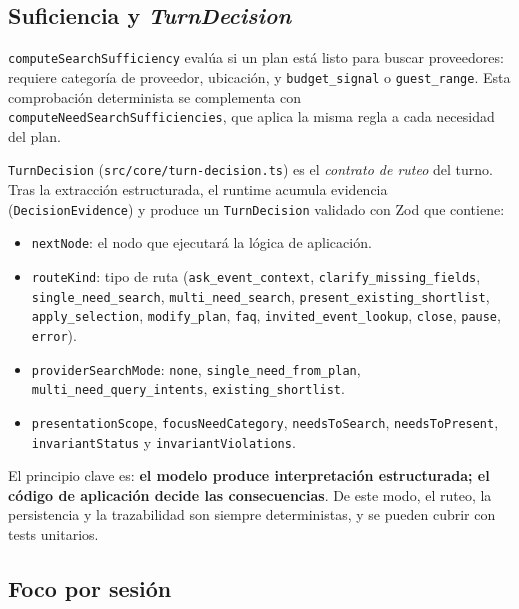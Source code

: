 \documentclass[11pt,a4paper]{article}
\begin{document}
\subsection{Suficiencia y \emph{TurnDecision}}

\texttt{computeSearchSufficiency} evalúa si un plan está listo para buscar
proveedores: requiere categoría de proveedor, ubicación, y
\texttt{budget\_signal} o \texttt{guest\_range}. Esta comprobación
determinista se complementa con \texttt{computeNeedSearchSufficiencies},
que aplica la misma regla a cada necesidad del plan.

\texttt{TurnDecision} (\texttt{src/core/turn-decision.ts}) es el
\emph{contrato de ruteo} del turno. Tras la extracción estructurada, el
runtime acumula evidencia (\texttt{DecisionEvidence}) y produce un
\texttt{TurnDecision} validado con Zod que contiene:

\begin{itemize}[leftmargin=*,itemsep=1pt]
  \item \texttt{nextNode}: el nodo que ejecutará la lógica de
        aplicación.
  \item \texttt{routeKind}: tipo de ruta
        (\texttt{ask\_event\_context}, \texttt{clarify\_missing\_fields},
        \texttt{single\_need\_search}, \texttt{multi\_need\_search},
        \texttt{present\_existing\_shortlist}, \texttt{apply\_selection},
        \texttt{modify\_plan}, \texttt{faq}, \texttt{invited\_event\_lookup},
        \texttt{close}, \texttt{pause}, \texttt{error}).
  \item \texttt{providerSearchMode}: \texttt{none},
        \texttt{single\_need\_from\_plan}, \texttt{multi\_need\_query\_intents},
        \texttt{existing\_shortlist}.
  \item \texttt{presentationScope}, \texttt{focusNeedCategory},
        \texttt{needsToSearch}, \texttt{needsToPresent},
        \texttt{invariantStatus} y \texttt{invariantViolations}.
\end{itemize}

El principio clave es: \textbf{el modelo produce interpretación
estructurada; el código de aplicación decide las consecuencias}. De este
modo, el ruteo, la persistencia y la trazabilidad son siempre
deterministas, y se pueden cubrir con tests unitarios.

\subsection{Foco por sesión}
\end{document}
